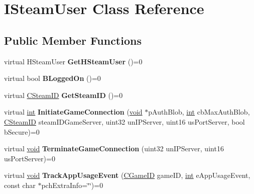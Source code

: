 \hypertarget{classISteamUser}{}\section{I\+Steam\+User Class Reference}
\label{classISteamUser}
\subsection*{Public Member Functions}
\begin{DoxyCompactItemize}
\item 
\hypertarget{classISteamUser_a17e683a53cb649d324d0614bece5a539}{}virtual H\+Steam\+User {\bfseries Get\+H\+Steam\+User} ()=0\label{classISteamUser_a17e683a53cb649d324d0614bece5a539}

\item 
\hypertarget{classISteamUser_a29e4a5e59dee5867f60732311fad2c4e}{}virtual bool {\bfseries B\+Logged\+On} ()=0\label{classISteamUser_a29e4a5e59dee5867f60732311fad2c4e}

\item 
\hypertarget{classISteamUser_a5a7659a6147a7bd3c0acf4065c3bed36}{}virtual \hyperlink{classCSteamID}{C\+Steam\+I\+D} {\bfseries Get\+Steam\+I\+D} ()=0\label{classISteamUser_a5a7659a6147a7bd3c0acf4065c3bed36}

\item 
\hypertarget{classISteamUser_ab243e44f96ea3070d7973deaa013afbd}{}virtual \hyperlink{SDL__thread_8h_a6a64f9be4433e4de6e2f2f548cf3c08e}{int} {\bfseries Initiate\+Game\+Connection} (\hyperlink{SDL__audio_8h_a52835ae37c4bb905b903cbaf5d04b05f}{void} $\ast$p\+Auth\+Blob, \hyperlink{SDL__thread_8h_a6a64f9be4433e4de6e2f2f548cf3c08e}{int} cb\+Max\+Auth\+Blob, \hyperlink{classCSteamID}{C\+Steam\+I\+D} steam\+I\+D\+Game\+Server, uint32 un\+I\+P\+Server, uint16 us\+Port\+Server, bool b\+Secure)=0\label{classISteamUser_ab243e44f96ea3070d7973deaa013afbd}

\item 
\hypertarget{classISteamUser_a67de2694f5b1abb4b22612ea3a43e46c}{}virtual \hyperlink{SDL__audio_8h_a52835ae37c4bb905b903cbaf5d04b05f}{void} {\bfseries Terminate\+Game\+Connection} (uint32 un\+I\+P\+Server, uint16 us\+Port\+Server)=0\label{classISteamUser_a67de2694f5b1abb4b22612ea3a43e46c}

\item 
\hypertarget{classISteamUser_a4f8099764ca59d6557a6a6174faa3883}{}virtual \hyperlink{SDL__audio_8h_a52835ae37c4bb905b903cbaf5d04b05f}{void} {\bfseries Track\+App\+Usage\+Event} (\hyperlink{classCGameID}{C\+Game\+I\+D} game\+I\+D, \hyperlink{SDL__thread_8h_a6a64f9be4433e4de6e2f2f548cf3c08e}{int} e\+App\+Usage\+Event, const char $\ast$pch\+Extra\+Info=\char`\"{}\char`\"{})=0\label{classISteamUser_a4f8099764ca59d6557a6a6174faa3883}


\end{DoxyCompactItemize}
